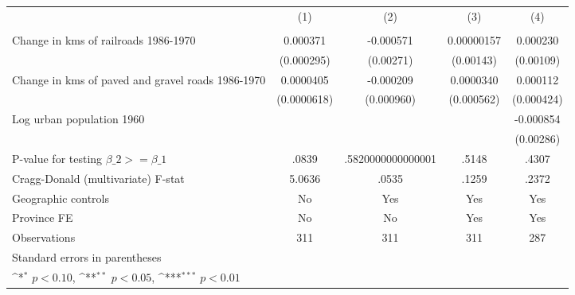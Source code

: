 {
\def\sym#1{\ifmmode^{#1}\else\(^{#1}\)\fi}
\begin{tabular}{l*{4}{c}}
\hline\hline
                &\multicolumn{1}{c}{(1)}&\multicolumn{1}{c}{(2)}&\multicolumn{1}{c}{(3)}&\multicolumn{1}{c}{(4)}\\
                &\multicolumn{1}{c}{}&\multicolumn{1}{c}{}&\multicolumn{1}{c}{}&\multicolumn{1}{c}{}\\
\hline
Change in kms of railroads 1986-1970& 0.000371         &-0.000571         &0.00000157         & 0.000230         \\
                &(0.000295)         &(0.00271)         &(0.00143)         &(0.00109)         \\
[1em]
Change in kms of paved and gravel roads 1986-1970&0.0000405         &-0.000209         &0.0000340         & 0.000112         \\
                &(0.0000618)         &(0.000960)         &(0.000562)         &(0.000424)         \\
[1em]
Log urban population 1960&                  &                  &                  &-0.000854         \\
                &                  &                  &                  &(0.00286)         \\
\hline
P-value for testing $\beta\_{2} >= \beta\_{1}$&    .0839         &.5820000000000001         &    .5148         &    .4307         \\
Cragg-Donald (multivariate) F-stat&   5.0636         &    .0535         &    .1259         &    .2372         \\
Geographic controls&       No         &      Yes         &      Yes         &      Yes         \\
Province FE     &       No         &       No         &      Yes         &      Yes         \\
Observations    &      311         &      311         &      311         &      287         \\
\hline\hline
\multicolumn{5}{l}{\footnotesize Standard errors in parentheses}\\
\multicolumn{5}{l}{\footnotesize \sym{*} \(p<0.10\), \sym{**} \(p<0.05\), \sym{***} \(p<0.01\)}\\
\end{tabular}
}
